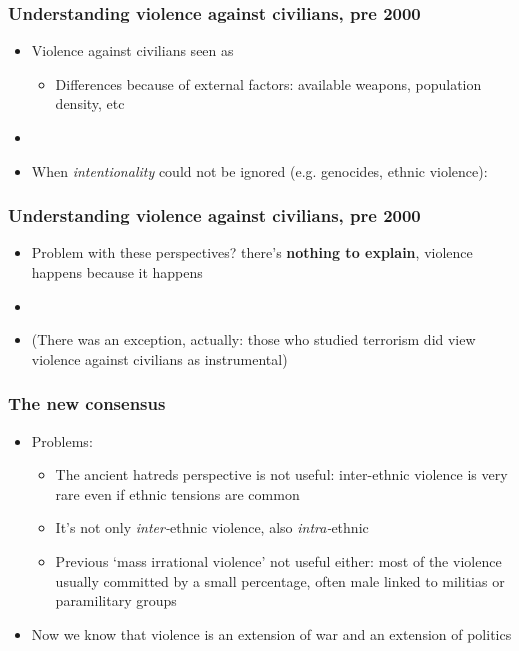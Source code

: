 \documentclass[aspectratio=43]{beamer}
\begin{document}
\begin{frame}
\frametitle{Understanding violence against civilians, pre 2000}
\centering

\begin{itemize}
  \item Violence against civilians seen as 
  \begin{itemize}
    \item Differences because of external factors: available weapons, population density, etc
  \end{itemize}
  \item
  \item When \textit{intentionality} could not be ignored (e.g. genocides, ethnic violence): 
\end{itemize}


\end{frame}

\begin{frame}
\frametitle{Understanding violence against civilians, pre 2000}
\centering

\begin{itemize}
  \item<1-> Problem with these perspectives? there's \textbf{nothing to explain}, violence happens because it happens
  \item[]
  \item<2->[] (There was an exception, actually: those who studied terrorism did view violence against civilians as instrumental)
\end{itemize}


\end{frame}

\begin{frame}
\frametitle{The new consensus}
\centering

\begin{itemize}[<+->]
  \item Problems:
  \begin{itemize}
    \item The ancient hatreds perspective is not useful: inter-ethnic violence is very rare even if ethnic tensions are common
    \item It's not only \textit{inter-}ethnic violence, also \textit{intra-}ethnic
    \item Previous `mass irrational violence' not useful either: most of the violence usually committed by a small percentage, often male linked to militias or paramilitary groups
  \end{itemize}
  \item Now we know that violence is an extension of war and an extension of politics
\end{itemize}



\end{frame}
\end{document}
